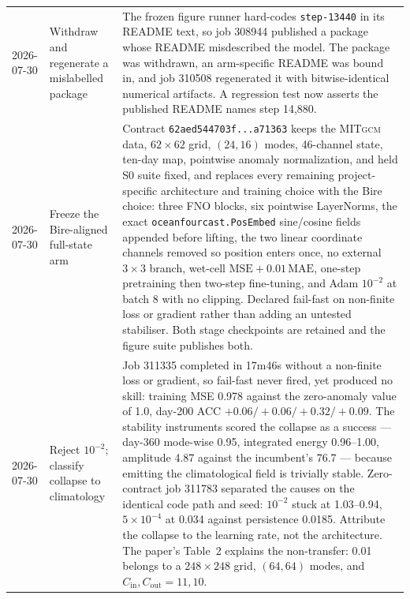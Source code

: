 \documentclass[11pt]{article}
\newcommand{\MITgcm}{\textsc{MITgcm}}
\begin{document}
\begin{longtable}{@{}p{}p{}p{}@{}}
2026-07-30 & Withdraw and regenerate a mislabelled package & The frozen figure runner hard-codes \texttt{step-13440} in its README text, so job 308944 published a package whose README misdescribed the model.  The package was withdrawn, an arm-specific README was bound in, and job 310508 regenerated it with bitwise-identical numerical artifacts.  A regression test now asserts the published README names step 14,880. \\
2026-07-30 & Freeze the Bire-aligned full-state arm & Contract \texttt{62aed544703f...a71363} keeps the \MITgcm{} data, \(62\times62\) grid, \((24,16)\) modes, 46-channel state, ten-day map, pointwise anomaly normalization, and held S0 suite fixed, and replaces every remaining project-specific architecture and training choice with the Bire choice: three FNO blocks, six pointwise LayerNorms, the exact \texttt{oceanfourcast.PosEmbed} sine/cosine fields appended before lifting, the two linear coordinate channels removed so position enters once, no external \(3\times3\) branch, wet-cell \(\mathrm{MSE}+0.01\,\mathrm{MAE}\), one-step pretraining then two-step fine-tuning, and Adam \(10^{-2}\) at batch 8 with no clipping.  Declared fail-fast on non-finite loss or gradient rather than adding an untested stabiliser.  Both stage checkpoints are retained and the figure suite publishes both. \\
2026-07-30 & Reject \(10^{-2}\); classify collapse to climatology & Job 311335 completed in 17m46s without a non-finite loss or gradient, so fail-fast never fired, yet produced no skill: training MSE 0.978 against the zero-anomaly value of 1.0, day-200 ACC \(+0.06/+0.06/+0.32/+0.09\).  The stability instruments scored the collapse as a success --- day-360 mode-wise 0.95, integrated energy 0.96--1.00, amplitude 4.87 against the incumbent's 76.7 --- because emitting the climatological field is trivially stable.  Zero-contract job 311783 separated the causes on the identical code path and seed: \(10^{-2}\) stuck at 1.03--0.94, \(5\times10^{-4}\) at 0.034 against persistence 0.0185.  Attribute the collapse to the learning rate, not the architecture.  The paper's Table~2 explains the non-transfer: 0.01 belongs to a \(248\times248\) grid, \((64,64)\) modes, and \(C_{\mathrm{in}},C_{\mathrm{out}}=11,10\). \\

\end{longtable}
\end{document}
